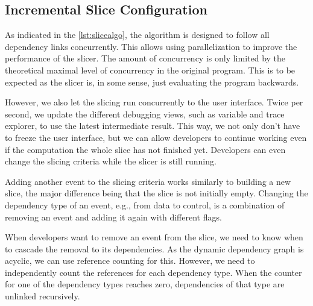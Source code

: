 
\subsection{Incremental Slice Configuration}

\tmpStart

As indicated in the \cref{lst:slicealgo}, the algorithm is designed to follow all dependency links concurrently.
This allows using parallelization to improve the performance of the slicer.
The amount of concurrency is only limited by the theoretical maximal level of concurrency in the original program.
This is to be expected as the slicer is, in some sense, just evaluating the program backwards.

However, we also let the slicing run concurrently to the user interface.
Twice per second, we update the different debugging views, such as variable and trace explorer, to use the latest intermediate result.
This way, we not only don't have to freeze the user interface, but we can allow developers to continue working even if the computation the whole slice has not finished yet.
Developers can even change the slicing criteria while the slicer is still running.

Adding another event to the slicing criteria works similarly to building a new slice, the major difference being that the slice is not initially empty.
Changing the dependency type of an event, e.g., from data to control, is a combination of removing an event and adding it again with different flags.

When developers want to remove an event from the slice, we need to know when to cascade the removal to its dependencies.
As the dynamic dependency graph is acyclic, we can use reference counting for this.
However, we need to independently count the references for each dependency type.
When the counter for one of the dependency types reaches zero, dependencies of that type are unlinked recursively.

\tmpEnd




